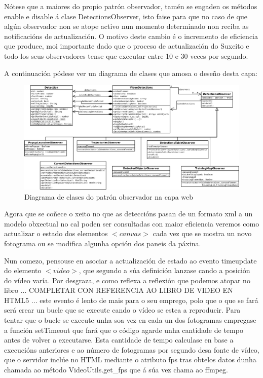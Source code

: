     Nótese que a maiores do propio patrón observador, tamén se engaden os métodos enable e disable á
    clase DetectionsObserver, isto faise para que no caso de que algún observador non se atope 
    activo nun momento determinado non reciba as notificacións de actualización. O motivo deste
    cambio é o incremento de eficiencia que produce, moi importante dado que o proceso de actualización
    do Suxeito e todo-los seus observadores tense que executar entre 10 e 30 veces por segundo.
    
    A continuación pódese ver un diagrama de clases que amosa o deseño desta capa:
    
    \begin{figure}[htp]
    \begin{center}
        \includegraphics[scale=0.2]{figures/CapaWebJS.png}
        \caption{Diagrama de clases do patrón observador na capa web}
    \label{fig:CapaWebJS}
    \end{center}
    \end{figure}
    
    Agora que se coñece o xeito no que as deteccións pasan de un formato xml a un modelo obxectual 
    no cal poden ser consultadas con maior eficiencia veremos como actualizar o estado dos elementos
    $<canvas>$ cada vez que se mostra un novo fotograma ou se modifica algunha opción dos paneis da
    páxina.
    
    Nun comezo, pensouse en asociar a actualización de estado ao evento timeupdate do elemento 
    $<video>$, que segundo a súa definición lanzase cando a posición do vídeo varía. Por desgraza, 
    e como reflexa a reflexión que podemos atopar no libro ... COMPLETAR CON REFERENCIA AO LIBRO DE
    VIDEO EN HTML5 ... este evento é lento de mais para o seu emprego, polo que o que se fará será
    crear un bucle que se execute cando o vídeo se estea a reproducir. Para tentar que o bucle se 
    execute unha soa vez en cada un dos fotogramas empregase a función setTimeout que fará que o 
    código agarde unha cantidade de tempo antes de volver a executarse. Esta cantidade de tempo 
    calculase en base a execucións anteriores e ao número de fotogramas por segundo desa fonte de 
    vídeo, que o servidor inclúe no HTML mediante o atributo fps tras obtelos datos dunha chamada ao
    método VideoUtils.get_fps que á súa vez chama ao ffmpeg.
    
